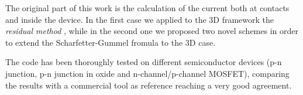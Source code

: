 The original part of this work is the calculation of the current both at contacts and inside the device. In the first case we applied to the 3D framework the \textit{residual method} \cite{ContactCurrentRM}, while in the second one we proposed two novel schemes in order to extend the Scharfetter-Gummel fromula \cite{Gummel:SignAnalys} to the 3D case.

The code has been thoroughly tested on different semiconductor devices (p-n junction, p-n junction in oxide and n-channel/p-channel MOSFET), comparing the results with a commercial tool as reference reaching a very good agreement.